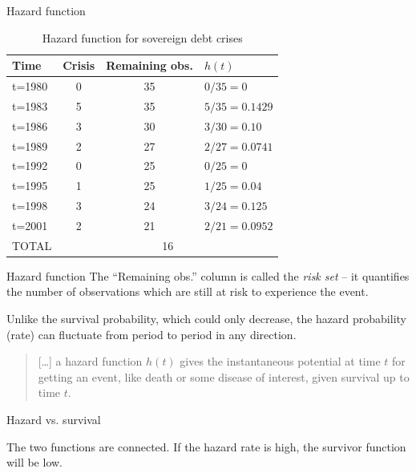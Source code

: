 \documentclass[12pt,english,pdf,xcolor=dvipsnames,aspectratio=169]{beamer}\usepackage[]{graphicx}\usepackage[]{xcolor}
\begin{document}
\begin{frame}{Hazard function}

\begin{table}
\centering
\begin{tabular}{l c c l}
\toprule
Time & Crisis & Remaining obs. & $h(t)$ \\
\midrule
t=1980 & 0 & 35 & $0/35=0$ \\
t=1983 & 5 & 35 & $5/35=0.1429$ \\
t=1986 & 3 & 30 & $3/30=0.10$ \\
t=1989 & 2 & 27 & $2/27=0.0741$ \\
t=1992 & 0 & 25 & $0/25=0$ \\
t=1995 & 1 & 25 & $1/25=0.04$ \\
t=1998 & 3 & 24 & $3/24=0.125$ \\
t=2001 & 2 & 21 & $2/21=0.0952$ \\
\midrule
TOTAL & \multicolumn{3}{c}{16} \\
\bottomrule
\end{tabular}
\caption*{Hazard function for sovereign debt crises}
\end{table}
\end{frame}



\begin{frame}{Hazard function}
 The ``Remaining obs.'' column is called the \textit{risk set} -- it quantifies the number of observations which are still at risk to experience the event.\bigskip

Unlike the survival probability, which could only decrease, the hazard probability (rate) can fluctuate from period to period in any direction.\bigskip

\begin{quote}
[\dots] a hazard function $h(t)$ gives the instantaneous potential at time $t$ for getting an event, like death or some disease of interest, given survival up to time $t$. \cite{Kleinbaum2012}
\end{quote}
\end{frame}



\begin{frame}{Hazard vs. survival}

\begin{figure}
\centering
{}
\end{figure}

The two functions are connected. If the hazard rate is high, the survivor function will be low.
\end{frame}
\end{document}
